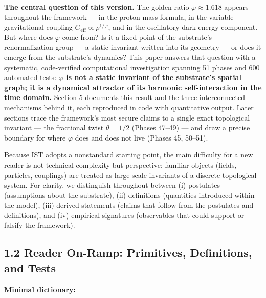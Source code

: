 \documentclass[
  11pt,
]{article}
\begin{document}
\textbf{The central question of this version.} The golden ratio
\(\varphi \approx 1.618\) appears throughout the framework --- in the
proton mass formula, in the variable gravitational coupling
\(G_{\text{eff}} \propto \rho^{1/\varphi}\), and in the oscillatory dark
energy component. But where does \(\varphi\) come from? Is it a fixed
point of the substrate's renormalization group --- a static invariant
written into its geometry --- or does it emerge from the substrate's
dynamics? This paper answers that question with a systematic,
code-verified computational investigation spanning 51 phases and 600
automated tests: \textbf{\(\varphi\) is not a static invariant of the
substrate's spatial graph; it is a dynamical attractor of its harmonic
self-interaction in the time domain.} Section 5 documents this result
and the three interconnected mechanisms behind it, each reproduced in
code with quantitative output. Later sections trace the framework's most
secure claims to a single exact topological invariant --- the fractional
twist \(\theta = 1/2\) (Phases 47--49) --- and draw a precise boundary
for where \(\varphi\) does and does not live (Phases 45, 50--51).

Because IST adopts a nonstandard starting point, the main difficulty for
a new reader is not technical complexity but perspective: familiar
objects (fields, particles, couplings) are treated as large-scale
invariants of a discrete topological system. For clarity, we distinguish
throughout between (i) postulates (assumptions about the substrate),
(ii) definitions (quantities introduced within the model), (iii) derived
statements (claims that follow from the postulates and definitions), and
(iv) empirical signatures (observables that could support or falsify the
framework).

\subsection{1.2 Reader On-Ramp: Primitives, Definitions, and
Tests}\label{reader-on-ramp-primitives-definitions-and-tests}

\textbf{Minimal dictionary:}
\end{document}
